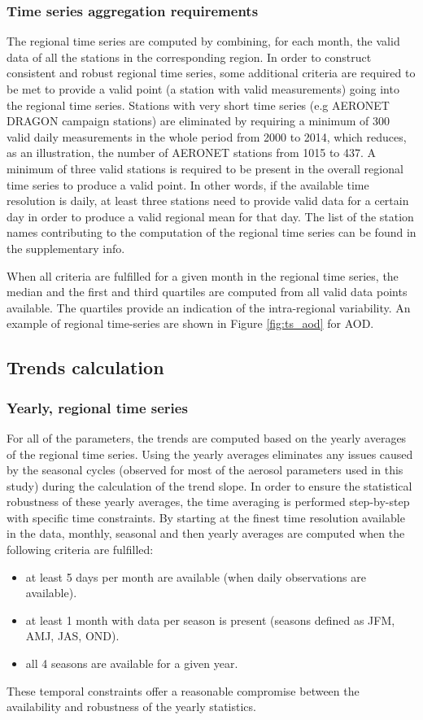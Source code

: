 \documentclass[acp, manuscript]{copernicus}
\begin{document}
\subsubsection{Time series aggregation requirements}
The regional time series are computed by combining, for each month, the valid data of all the stations in the corresponding region. In order to construct consistent and robust regional time series, some additional criteria are required to be met to provide a valid point (a station with valid measurements) going into the regional time series. Stations with very short time series (e.g AERONET DRAGON campaign stations) are eliminated by requiring a minimum of 300 valid daily measurements in the whole period from 2000 to 2014, which reduces, as an illustration, the number of AERONET stations from 1015 to 437. A minimum of three valid stations is required to be present in the overall regional time series to produce a valid point. In other words, if the available time resolution is daily, at least three stations need to provide valid data for a certain day in order to produce a valid regional mean for that day.  The list of the station names contributing to the computation of the regional time series can be found in the supplementary info.

When all criteria are fulfilled for a given month in the regional time series, the median and the first and third quartiles are computed from all valid data points available. The quartiles provide an indication of the intra-regional variability. An example of regional time-series are shown in Figure \ref{fig:ts_aod} for AOD.


\subsection{Trends calculation}

\subsubsection{Yearly, regional time series}
For all of the parameters, the trends are computed based on the yearly averages of the regional time series. Using the yearly averages eliminates any issues caused by the seasonal cycles (observed for most of the aerosol parameters used in this study) during the calculation of the trend slope. In order to ensure the statistical robustness of these yearly averages, the time averaging is performed step-by-step with specific time constraints. By starting at the finest time resolution available in the data, monthly, seasonal and then yearly averages are computed when the following criteria are fulfilled:
\begin{itemize}
 \item at least 5 days per month are available (when daily observations are available).
 \item at least 1 month with data per season is present (seasons defined as JFM, AMJ, JAS, OND).
 \item all 4 seasons are available for a given year.
\end{itemize}
These temporal constraints offer a reasonable compromise between the availability and robustness of the yearly statistics.
\end{document}
